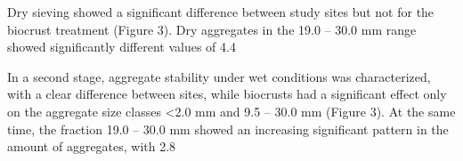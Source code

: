 Dry sieving showed a significant difference between study sites but not for the biocrust treatment (Figure 3). Dry aggregates in the 19.0 – 30.0 mm range showed significantly different values of 4.4%

In a second stage, aggregate stability under wet conditions was characterized, with a clear difference between sites, while biocrusts had a significant effect only on the aggregate size classes <2.0 mm and 9.5 – 30.0 mm (Figure 3). At the same time, the fraction 19.0 – 30.0 mm showed an increasing significant pattern in the amount of aggregates, with 2.8%

